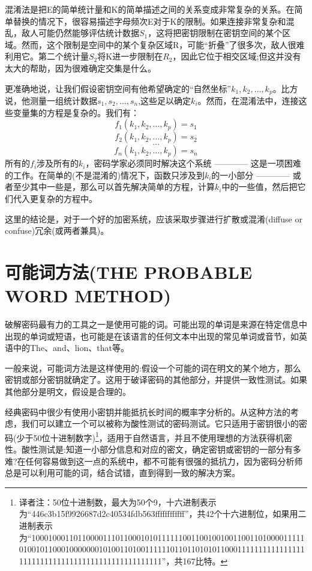 \documentclass[]{article}
\begin{document}
混淆法是把E的简单统计量和K的简单描述之间的关系变成非常复杂的关系。在简单替换的情况下，很容易描述字母频次E对于K的限制。如果连接非常复杂和混乱，敌人可能仍然能够评估统计数据$S_1$，这将把密钥限制在密钥空间的某个区域。然而，这个限制是空间中的某个复杂区域R，可能“折叠”了很多次，敌人很难利用它。第二个统计量$S_2$将K进一步限制在$R_2$，因此它位于相交区域;但这并没有太大的帮助，因为很难确定交集是什么。

更准确地说，让我们假设密钥空间有他希望确定的“自然坐标”$k_1,k_2,\ldots,k_p$。比方说，他测量一组统计数据$s_1,s_2,\ldots,s_n$,这些足以确定$k_i$。然而，在混淆法中，连接这些变量集的方程是复杂的。我们有：
\[f_1(k_1,k_2,\ldots,k_p)=s_1\]
\[f_2(k_1,k_2,\ldots,k_p)=s_2\]
\[\ldots\]
\[f_n(k_1,k_2,\ldots,k_p)=s_n\]
所有的$f_i$涉及所有的$k_i$，密码学家必须同时解决这个系统 ———— 这是一项困难的工作。在简单的(不是混淆的)情况下，函数只涉及到$k_i$的一小部分 ———— 或者至少其中一些是，那么可以首先解决简单的方程，计算$k_i$中的一些值，然后把它们代入更复杂的方程中。

这里的结论是，对于一个好的加密系统，应该采取步骤进行扩散或混淆(diffuse or confuse)冗余(或两者兼具)。


\newpage
%   
%


\section{可能词方法(THE PROBABLE WORD METHOD)}


破解密码最有力的工具之一是使用可能的词。可能出现的单词是来源在特定信息中出现的单词或短语，也可能是在该语言的任何文本中出现的常见单词或音节，如英语中的The、and、lion、that等。

一般来说，可能词方法是这样使用的:假设一个可能的词在明文的某个地方，那么密钥或部分密钥就确定了。这用于破译密码的其他部分，并提供一致性测试。如果其他部分是明文，假设是合理的。

经典密码中很少有使用小密钥并能抵抗长时间的概率字分析的。从这种方法的考虑，我们可以建立一个可以被称为酸性测试的密码测试。它只适用于密钥很小的密码(少于50位十进制数字)\footnote{译者注：50位十进制数，最大为50个9，十六进制表示为“446c3b15f9926687d2c40534fdb563ffffffffffff”，共42个十六进制位，如果用二进制表示为“10001000110110000111011000101011111100110010010011001101000011111010010110001000000010100110100111111011011010101100011111111111111111111111111111111111111111111111111”，共167比特。}，适用于自然语言，并且不使用理想的方法获得机密性。酸性测试是:知道一小部分信息和对应的密文，确定密钥或密钥的一部分有多难?在任何容易做到这一点的系统中，都不可能有很强的抵抗力，因为密码分析师总是可以利用可能的词，结合试错，直到得到一致的解决方案。
\end{document}
